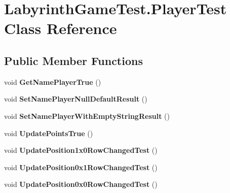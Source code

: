 \hypertarget{class_labyrinth_game_test_1_1_player_test}{\section{Labyrinth\+Game\+Test.\+Player\+Test Class Reference}
\label{class_labyrinth_game_test_1_1_player_test}
}
\subsection*{Public Member Functions}
\begin{DoxyCompactItemize}
\item 
\hypertarget{class_labyrinth_game_test_1_1_player_test_a373be26164636a303e77dae8745f7bbd}{void {\bfseries Get\+Name\+Player\+True} ()}\label{class_labyrinth_game_test_1_1_player_test_a373be26164636a303e77dae8745f7bbd}

\item 
\hypertarget{class_labyrinth_game_test_1_1_player_test_ac52f0c03bc275e7e7d15753dc44b2fbb}{void {\bfseries Set\+Name\+Player\+Null\+Default\+Result} ()}\label{class_labyrinth_game_test_1_1_player_test_ac52f0c03bc275e7e7d15753dc44b2fbb}

\item 
\hypertarget{class_labyrinth_game_test_1_1_player_test_a3b11462d57fadf777a7b89f8517ccef0}{void {\bfseries Set\+Name\+Player\+With\+Empty\+String\+Result} ()}\label{class_labyrinth_game_test_1_1_player_test_a3b11462d57fadf777a7b89f8517ccef0}

\item 
\hypertarget{class_labyrinth_game_test_1_1_player_test_a0992d32fcd104098f7297527bcf736b7}{void {\bfseries Update\+Points\+True} ()}\label{class_labyrinth_game_test_1_1_player_test_a0992d32fcd104098f7297527bcf736b7}

\item 
\hypertarget{class_labyrinth_game_test_1_1_player_test_ad0f21e81e955dc92818851f3b05124aa}{void {\bfseries Update\+Position1x0\+Row\+Changed\+Test} ()}\label{class_labyrinth_game_test_1_1_player_test_ad0f21e81e955dc92818851f3b05124aa}

\item 
\hypertarget{class_labyrinth_game_test_1_1_player_test_a72fa4a12a1230e0e9474c503f619fd0b}{void {\bfseries Update\+Position0x1\+Row\+Changed\+Test} ()}\label{class_labyrinth_game_test_1_1_player_test_a72fa4a12a1230e0e9474c503f619fd0b}

\item 
\hypertarget{class_labyrinth_game_test_1_1_player_test_a07b921c06a8775c83f0773221e2de4c5}{void {\bfseries Update\+Position0x0\+Row\+Changed\+Test} ()}\label{class_labyrinth_game_test_1_1_player_test_a07b921c06a8775c83f0773221e2de4c5}


\end{DoxyCompactItemize}
